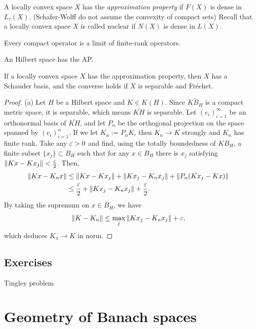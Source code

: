 \documentclass{../../large}
\begin{document}
\begin{prb}
A locally convex space $X$ has the \emph{approximation property} if $F(X)$ is dense in $L_\tau(X)$.
(Schafer-Wolff do not assume the convexity of compact sets)
Recall that a locally convex space $X$ is called nuclear if $N(X)$ is dense in $L(X)$.


Every compact operator is a limit of finite-rank operators.
\begin{parts}
\item An Hilbert space has the AP.
\item If a locally convex space $X$ has the approximation property, then $X$ has a Schauder basis, and the converse holds if $X$ is separable and Fr\'echet.
\end{parts}
\end{prb}
\begin{proof}
(a)
Let $H$ be a Hilbert space and $K\in K(H)$.
Since $\bar{KB_H}$ is a compact metric space, it is separable, which means $\bar{KH}$ is separable.
Let $(e_i)_{i=1}^\infty$ be an orthonormal basis of $\bar{KH}$, and let $P_n$ be the orthogonal projection on the space spanned by $(e_i)_{i=1}^n$.
If we let $K_n:=P_nK$, then $K_n\to K$ strongly and $K_n$ has finite rank.
Take any $\varepsilon>0$ and find, using the totally boundedness of $KB_H$, a finite subset $\{x_j\}\subset B_H$ such that for any $x\in B_H$ there is $x_j$ satisfying $\|Kx-Kx_j\|<\frac{\varepsilon}2$.
Then,
\begin{align*}
\|Kx-K_nx\|
&\le\|Kx-Kx_j\|+\|Kx_j-K_nx_j\|+\|P_n(Kx_j-Kx)\|\\
&\le\frac{\varepsilon}2+\|Kx_j-K_nx_j\|+\frac{\varepsilon}2.
\end{align*}
By taking the supremum on $x\in B_H$, we have
\[\|K-K_n\|\le\max_j\|Kx_j-K_nx_j\|+\varepsilon,\]
which deduces $K_n\to K$ in norm.

\end{proof}




\section*{Exercises}
Tingley problem



\chapter{Geometry of Banach spaces}


\section{}
\end{document}

